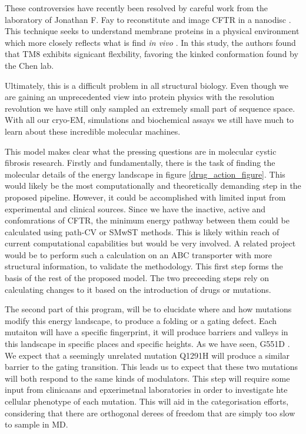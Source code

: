 These controversies have recently been resolved by careful work from the laboratory of Jonathan F. Fay to reconstitute and image CFTR in a nanodisc \cite{aleksandrov2022}. This technique seeks to understand membrane proteins in a physical environment which more closely reflects what is find \textit{in vivo} \cite{}. In this study, the authors found that TM8 exhibits signicant flexbility, favoring the kinked conformation found by the Chen lab.

Ultimately, this is a difficult problem in all structural biology. Even though we are gaining an unprecedented view into protein physics with the resolution revolution we have still only sampled an extremely small part of sequence space. With all our cryo-EM, simulations and biochemical assays we still have much to learn about these incredible molecular machines.



This model makes clear what the pressing questions are in molecular cystic fibrosis research. Firstly and fundamentally, there is the task of finding the molecular details of the energy landscape in figure \ref{drug_action_figure}.  This would likely be the most computationally and theoretically demanding step in the proposed pipeline. However, it could be accomplished with limited input from experimental and clinical sources. Since we have the inactive, active and confomrations of CFTR, the minimum energy pathway between them could be calculated using path-CV or SMwST methods. This is likely within reach of current computational capabilities but would be very involved. A related project would be to perform such a calculation on an ABC transporter with more structural information, to validate the methodology. This first step forms the basis of the rest of the proposed model. The two preceeding steps rely on calculating changes to it based on the introduction of drugs or mutations.

The second part of this program, will be to elucidate where and how mutations modify this energy landscape, to produce a folding or a gating defect. Each mutaiton will have a specific fingerprint, it will produce barriers and valleys in this landscape in specific places and specific heights. As we have seen, G551D . We expect that a seemingly unrelated mutation Q1291H will produce a similar barrier to the gating transition. This leads us to expect that these two mutations will both respond to the same kinds of modulators. This step will require some input from clinicaans and epxerimetnal laboratories in order to investigate hte cellular phenotype of each mutation. This will aid in the categorisation efforts, considering that there are orthogonal derees of freedom that are simply too slow to sample in MD.

